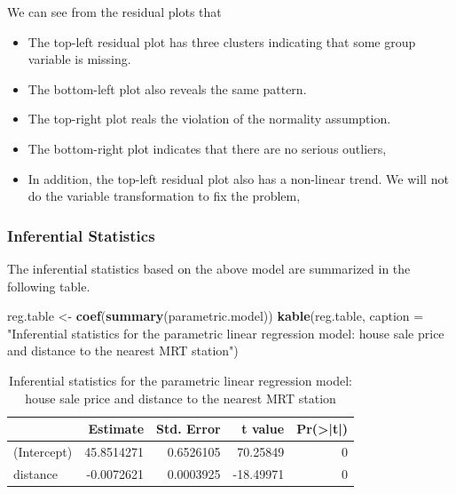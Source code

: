 \documentclass[
]{book}
\newenvironment{Shaded}{\begin{snugshade}}{\end{snugshade}}
\newcommand{\AttributeTok}[1]{\textcolor[rgb]{0.13,0.29,0.53}{#1}}
\newcommand{\FunctionTok}[1]{\textcolor[rgb]{0.13,0.29,0.53}{\textbf{#1}}}
\newcommand{\NormalTok}[1]{#1}
\newcommand{\OtherTok}[1]{\textcolor[rgb]{0.56,0.35,0.01}{#1}}
\newcommand{\StringTok}[1]{\textcolor[rgb]{0.31,0.60,0.02}{#1}}
\begin{document}
We can see from the residual plots that

\begin{itemize}
\item
  The top-left residual plot has three clusters indicating that some group variable is missing.
\item
  The bottom-left plot also reveals the same pattern.
\item
  The top-right plot reals the violation of the normality assumption.
\item
  The bottom-right plot indicates that there are no serious outliers,
\item
  In addition, the top-left residual plot also has a non-linear trend. We will not do the variable transformation to fix the problem,
\end{itemize}

\hypertarget{inferential-statistics}{%
\subsubsection{Inferential Statistics}\label{inferential-statistics}}

The inferential statistics based on the above model are summarized in the following table.

\begin{Shaded}
\begin{Highlighting}[]
\NormalTok{reg.table }\OtherTok{\textless{}{-}} \FunctionTok{coef}\NormalTok{(}\FunctionTok{summary}\NormalTok{(parametric.model))}
\FunctionTok{kable}\NormalTok{(reg.table, }\AttributeTok{caption =} \StringTok{"Inferential statistics for the parametric linear}
\StringTok{      regression model: house sale price and distance to the nearest MRT station"}\NormalTok{)}
\end{Highlighting}
\end{Shaded}

\begin{table}

\caption{\label{tab:unnamed-chunk-70}Inferential statistics for the parametric linear
      regression model: house sale price and distance to the nearest MRT station}
\centering
\begin{tabular}[t]{l|r|r|r|r}
\hline
  & Estimate & Std. Error & t value & Pr(>|t|)\\
\hline
(Intercept) & 45.8514271 & 0.6526105 & 70.25849 & 0\\
\hline
distance & -0.0072621 & 0.0003925 & -18.49971 & 0\\
\hline
\end{tabular}
\end{table}
\end{document}
